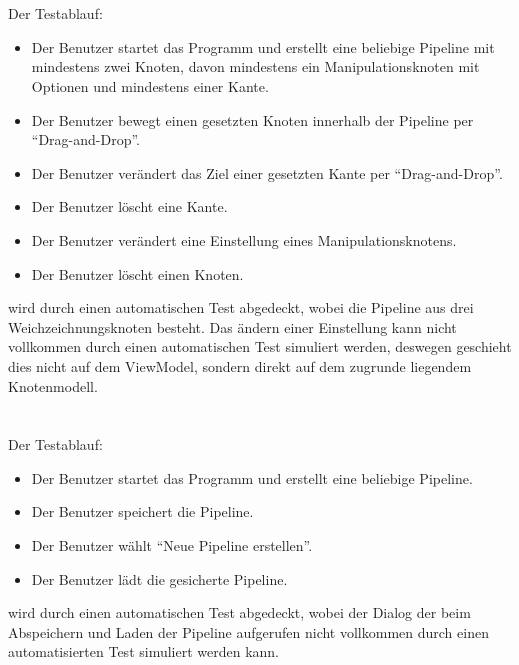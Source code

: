 \paragraph{}

\paragraph{} ~\\

Der Testablauf:

\begin{itemize}
	\item Der Benutzer startet das Programm und erstellt eine beliebige Pipeline mit mindestens zwei Knoten, davon mindestens ein Manipulationsknoten mit Optionen und mindestens einer Kante.
			\item Der Benutzer bewegt einen gesetzten Knoten innerhalb der Pipeline per ``Drag-and-Drop''.
			\item Der Benutzer verändert das Ziel einer gesetzten Kante per ``Drag-and-Drop''.
			\item Der Benutzer löscht eine Kante.
			\item Der Benutzer verändert eine Einstellung eines Manipulationsknotens.
			\item Der Benutzer löscht einen Knoten.
\end{itemize}

wird durch einen automatischen Test abgedeckt, wobei die Pipeline aus drei Weichzeichnungsknoten besteht. Das ändern einer Einstellung kann nicht vollkommen durch einen automatischen Test simuliert werden, deswegen geschieht dies nicht auf dem ViewModel, sondern direkt auf dem zugrunde liegendem Knotenmodell.


\paragraph{} ~\\

Der Testablauf:

\begin{itemize}
	\item Der Benutzer startet das Programm und erstellt eine beliebige Pipeline.
	\item Der Benutzer speichert die Pipeline.
	\item Der Benutzer wählt ``Neue Pipeline erstellen''.
	\item Der Benutzer lädt die gesicherte Pipeline.
\end{itemize}

wird durch einen automatischen Test abgedeckt, wobei der Dialog der beim Abspeichern und Laden der Pipeline aufgerufen nicht vollkommen durch einen automatisierten Test simuliert werden kann.

\paragraph{}

\paragraph{}
